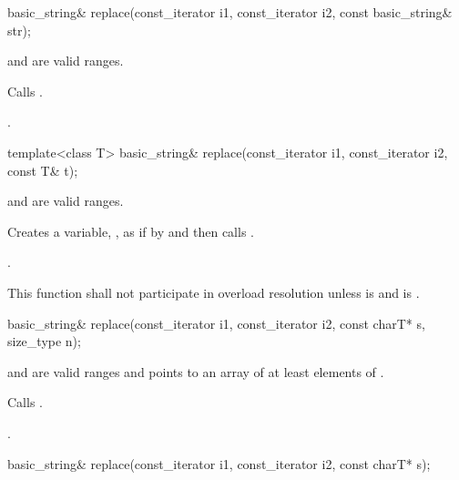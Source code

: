 %
\begin{itemdecl}
basic_string& replace(const_iterator i1, const_iterator i2, const basic_string& str);
\end{itemdecl}

\begin{itemdescr}
\pnum
\requires
{} and  are valid ranges.

\pnum
\effects
Calls .

\pnum
\returns
{}.
\end{itemdescr}

%
\begin{itemdecl}
template<class T>
  basic_string& replace(const_iterator i1, const_iterator i2, const T& t);
\end{itemdecl}

\begin{itemdescr}
\pnum
\requires
{} and  are valid ranges.

\pnum
\effects
Creates a variable, , as if by
 and then
calls .

\pnum
\returns
{}.

\pnum
\remarks
This function shall not participate in overload resolution unless
 is  and
 is .
\end{itemdescr}

%
\begin{itemdecl}
basic_string& replace(const_iterator i1, const_iterator i2, const charT* s, size_type n);
\end{itemdecl}

\begin{itemdescr}
\pnum
\requires {} and  are valid ranges and
 points to an array of at least  elements of .

\pnum
\effects Calls .

\pnum
\returns
{}.
\end{itemdescr}

%
\begin{itemdecl}
basic_string& replace(const_iterator i1, const_iterator i2, const charT* s);
\end{itemdecl}

